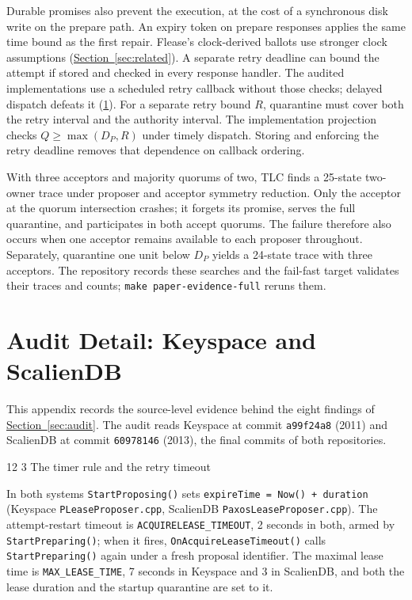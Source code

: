 \documentclass[final,5p,times,twocolumn,number]{elsarticle}
\makeatletter
\newcommand{\code}[1]{\texttt{#1}}
\newcommand{\secref}[1]{\hyperref[#1]{Section~\ref*{#1}}}
\renewcommand\subsection{\@startsection{subsection}{2}{\z@}%
           {12\p@ \@plus 6\p@ \@minus 3\p@}%
           {3\p@ \@plus 6\p@ \@minus 3\p@}%
           {\normalfont\normalsize\bfseries}}
\makeatother
\begin{document}
Durable promises also prevent the execution, at the cost of a synchronous disk write on the prepare path.  An expiry token on prepare responses applies the same time bound as the first repair.  Flease's clock-derived ballots use stronger clock assumptions (\secref{sec:related}).  A separate retry deadline can bound the attempt if stored and checked in every response handler.  The audited implementations use a scheduled retry callback without those checks; delayed dispatch defeats it (\ref{app:audit}).  For a separate retry bound $R$, quarantine must cover both the retry interval and the authority interval.  The implementation projection checks $Q \geq \max(D_P,R)$ under timely dispatch.  Storing and enforcing the retry deadline removes that dependence on callback ordering.

With three acceptors and majority quorums of two, TLC finds a 25-state two-owner trace under proposer and acceptor symmetry reduction.  Only the acceptor at the quorum intersection crashes; it forgets its promise, serves the full quarantine, and participates in both accept quorums.  The failure therefore also occurs when one acceptor remains available to each proposer throughout.  Separately, quarantine one unit below $D_P$ yields a 24-state trace with three acceptors.  The repository records these searches and the fail-fast target validates their traces and counts; \code{make paper-evidence-full} reruns them.

\section{Audit Detail: Keyspace and ScalienDB}\label{app:audit}

This appendix records the source-level evidence behind the eight findings of \secref{sec:audit}.  The audit reads Keyspace at commit \code{a99f24a8} (2011) and ScalienDB at commit \code{60978146} (2013), the final commits of both repositories.

\subsection{The timer rule and the retry timeout}

In both systems \code{StartProposing()} sets \code{expireTime = Now() + duration} (Keyspace \code{PLeaseProposer.cpp}, ScalienDB \code{PaxosLeaseProposer.cpp}).  The attempt-restart timeout is \code{ACQUIRELEASE\_TIMEOUT}, 2 seconds in both, armed by \code{StartPreparing()}; when it fires, \code{OnAcquireLeaseTimeout()} calls \code{StartPreparing()} again under a fresh proposal identifier.  The maximal lease time is \code{MAX\_LEASE\_TIME}, 7 seconds in Keyspace and 3 in ScalienDB, and both the lease duration and the startup quarantine are set to it.
\end{document}
